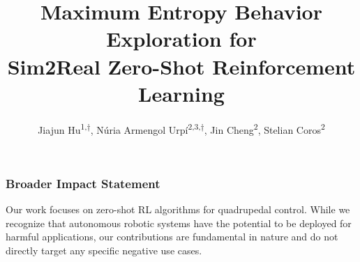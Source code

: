\documentclass[10pt]{article} %
\title{Maximum Entropy Behavior Exploration for \\ Sim2Real Zero-Shot Reinforcement Learning} %
\author{Jiajun Hu\textsuperscript{1,$\dagger$}, Núria Armengol Urpí\textsuperscript{2,3,$\dagger$}, Jin Cheng\textsuperscript{2}, Stelian Coros\textsuperscript{2}}
\newcommand{\nuria}[1]{\textcolor{red}{#1}}
\begin{document}
\maketitle  %














\subsubsection*{Broader Impact Statement}
\label{sec:broaderImpact}
Our work focuses on zero-shot RL algorithms for quadrupedal control. While we recognize that autonomous robotic systems have the potential to be deployed for harmful applications, our contributions are fundamental in nature and do not directly target any specific negative use cases.

\appendix

\end{document}
